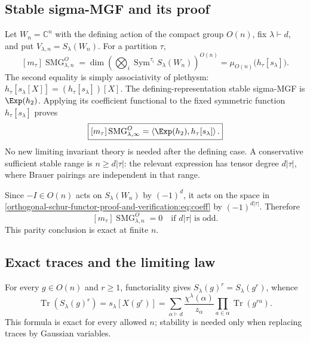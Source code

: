 \documentclass[10pt]{article}
\newcommand{\Sym}{\operatorname{Sym}}
\newcommand{\Tr}{\operatorname{Tr}}
\newcommand{\SMG}{\operatorname{SMG}}
\newcommand{\MGF}{\SMG}
\begin{document}
\subsection{Stable sigma-MGF and its proof}
Let $W_n=\mathbb C^n$ with the defining action of the compact group $O(n)$, fix $\lambda\vdash d$, and put $V_{\lambda,n}=S_\lambda(W_n)$. For a partition $\tau$,
\begin{equation}\label{orthogonal-schur-functor-proof-and-verification:eq:coeff}
 [m_\tau]\MGF^O_{\lambda,n}
 =\dim\left(\bigotimes_i\Sym^{\tau_i}S_\lambda(W_n)\right)^{O(n)}
 =\mu_{O(n)}\bigl(h_\tau[s_\lambda]\bigr).
\end{equation}
The second equality is simply associativity of plethysm:
$h_\tau[s_\lambda[X]]=(h_\tau[s_\lambda])[X]$.
The defining-representation stable sigma-MGF is $\Exp(h_2)$. Applying its coefficient functional to the fixed symmetric function $h_\tau[s_\lambda]$ proves
\begin{equation}\label{orthogonal-schur-functor-proof-and-verification:eq:push}
 \boxed{[m_\tau]\MGF^O_{\lambda,\infty}
 =\left\langle\Exp(h_2),h_\tau[s_\lambda]\right\rangle.}
\end{equation}
No new limiting invariant theory is needed after the defining case. A conservative sufficient stable range is $n\ge d|\tau|$: the relevant expression has tensor degree $d|\tau|$, where Brauer pairings are independent in that range.

Since $-I\in O(n)$ acts on $S_\lambda(W_n)$ by $(-1)^d$, it acts on the space in \eqref{orthogonal-schur-functor-proof-and-verification:eq:coeff} by $(-1)^{d|\tau|}$. Therefore
\begin{equation}\label{orthogonal-schur-functor-proof-and-verification:eq:parity}
 \boxed{[m_\tau]\MGF^O_{\lambda,n}=0\quad\text{if }d|\tau|\text{ is odd}.}
\end{equation}
This parity conclusion is exact at finite $n$.

\subsection{Exact traces and the limiting law}
For every $g\in O(n)$ and $r\ge1$, functoriality gives $S_\lambda(g)^r=S_\lambda(g^r)$, whence
\begin{equation}\label{orthogonal-schur-functor-proof-and-verification:eq:trace}
 \boxed{\Tr(S_\lambda(g)^r)=s_\lambda[X(g^r)]
 =\sum_{\alpha\vdash d}\frac{\chi^\lambda(\alpha)}{z_\alpha}
 \prod_{a\in\alpha}\Tr(g^{ra}).}
\end{equation}
This formula is exact for every allowed $n$; stability is needed only when replacing traces by Gaussian variables.
\end{document}
